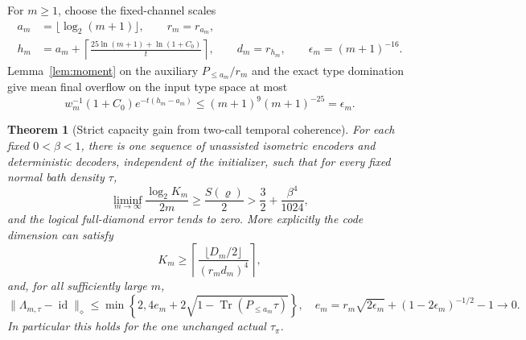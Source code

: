 \documentclass[11pt]{article}
\newtheorem{theorem}{Theorem}[section]
\newcommand{\Tr}{\operatorname{Tr}}
\newcommand{\id}{\operatorname{id}}
\newcommand{\norm}[1]{\lVert #1\rVert}
\begin{document}
For $m\ge1$, choose the fixed-channel scales
\[
\begin{split}
 a_m&=\lfloor\log_2(m+1)\rfloor,\qquad r_m=r_{a_m},\\
 h_m&=a_m+\left\lceil\frac{25\ln(m+1)+\ln(1+C_0)}{t}\right\rceil,
 \qquad d_m=r_{h_m},\qquad \epsilon_m=(m+1)^{-16}.
\end{split}\tag{31}
\]
Lemma~\ref{lem:moment} on the auxiliary $P_{\le a_m}/r_m$ and the exact type
domination give mean final overflow on the input type space at most
\[
 w_m^{-1}(1+C_0)e^{-t(h_m-a_m)}\le(m+1)^9(m+1)^{-25}=\epsilon_m.
 \tag{32}
\]

\begin{theorem}[Strict capacity gain from two-call temporal coherence]
\label{thm:gain}
For each fixed $0<\beta<1$, there is one sequence of unassisted isometric
encoders and deterministic decoders, independent of the initializer, such
that for every fixed normal bath density $\tau$,
\[
 \liminf_{m\to\infty}\frac{\log_2K_m}{2m}\ge\frac{S(\varrho)}2
 >\frac32+\frac{\beta^4}{1024},
 \tag{33}
\]
and the logical full-diamond error tends to zero. More explicitly the code
dimension can satisfy
\[
 K_m\ge\left\lceil\frac{\lfloor D_m/2\rfloor}{(r_md_m)^4}\right\rceil,
 \tag{34}
\]
and, for all sufficiently large $m$,
\[
 \norm{\Lambda_{m,\tau}-\id}_\diamond
 \le\min\left\{2,4e_m+2\sqrt{1-\Tr(P_{\le a_m}\tau)}\right\},
 \quad
 e_m=r_m\sqrt{2\epsilon_m}+(1-2\epsilon_m)^{-1/2}-1\longrightarrow0.
 \tag{35}
\]
In particular this holds for the one unchanged actual $\tau_\pi$.
\end{theorem}
\end{document}
